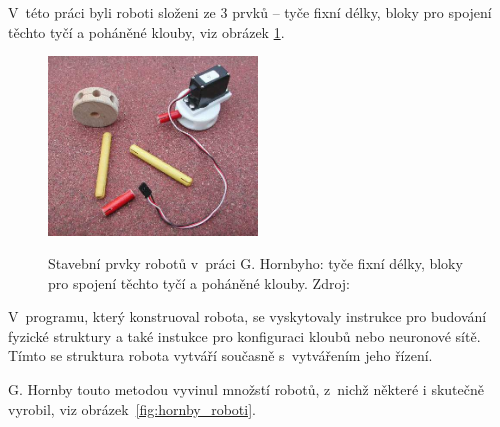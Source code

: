 V~této práci byli roboti složeni ze 3 prvků -- tyče fixní délky, bloky pro spojení těchto tyčí a poháněné klouby, viz obrázek \ref{fig:hornby_stavebni_prvky}.

\begin{figure}[h]
    \centering
    {\includegraphics[width=15em]{obrazky/hornby_stavebni_prvky.png}}
    \caption[Stavební prvky robotů v~práci G. Hornbyho]{
    Stavební prvky robotů v~práci G. Hornbyho: tyče fixní délky, bloky pro spojení těchto tyčí a poháněné klouby. Zdroj:~\cite{Hornby2003}
    }
    \label{fig:hornby_stavebni_prvky}
\end{figure}

V~programu, který konstruoval robota, se vyskytovaly instrukce pro budování fyzické struktury a také instukce pro konfiguraci kloubů nebo neuronové sítě.
Tímto se struktura robota vytváří současně s~vytvářením jeho řízení.

G. Hornby touto metodou vyvinul množstí robotů, z~nichž některé i skutečně vyrobil, viz obrázek~\ref{fig:hornby_roboti}.

